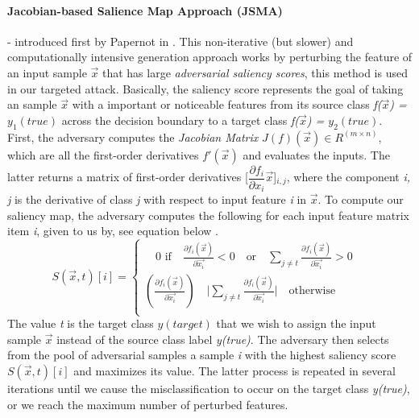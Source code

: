 \documentclass[grad,lot,lof,11pt,oneside,onehalfspace]{RUthesis}
\begin{document}
\paragraph{Jacobian-based Salience Map Approach (JSMA)} - introduced first by Papernot in \cite{papernot_limitations_2016}. This non-iterative (but slower) and computationally intensive generation approach works by perturbing the feature of an input sample $\vec{x}$ that has large \textit{adversarial saliency scores}, this method is used in our targeted attack. Basically, the saliency score represents the goal of taking an sample $\vec{x}$ with a important or noticeable features from its source class \textit{f($\vec{x}$) =  \textit{$y_{1}(true)$}} across the decision boundary to a target class \textit{f($\vec{x}$) =  \textit{$y_{2}(true)$}}.\newline\\
First, the adversary computes the \textit{Jacobian Matrix} \textit{$J(f)(\vec{x})\in R^{(m\times n)}$}, which are all the first-order derivatives \textit{$f'(\vec{x})$} and evaluates the inputs. The latter returns a matrix of first-order derivatives [$\dfrac{\partial f_{i}}{\partial x_{i}}\vec{x}$]$_{i,j}$, where the component\textit{ i, j} is the derivative of class \textit{j} with respect to input feature \textit{i} in \textit{$\vec{x}$}. To compute our saliency map, the adversary computes the following for each input feature  matrix item  \textit{i}, given to us by, see equation below \cite{papernot_cleverhans_2016}.
\begin{equation}
S(\vec{x}, t)[i] =
\begin{cases} 
\quad \textrm{0 if} \quad \frac{\partial f_{i}(\vec{x})}{\partial\vec{x_{i}}} < 0 \quad \textrm{or} \quad \sum_{j\neq t} \frac{\partial f_{i}(\vec{x})}{\partial\vec{x_{i}}} > \textrm{0} \quad\\
(\frac{\partial f_{i}(\vec{x})}{\partial\vec{x_{i}}}) \quad \lvert\sum_{j\neq t} \frac{\partial f_{i}(\vec{x})}{\partial\vec{x_{i}}}\rvert \quad \textrm{otherwise} \quad\\
\end{cases}
\end{equation}    
The value \textit{t} is the target class \textit{$y(target)$} that we wish to assign the input sample $\vec{x}$ instead of the source class label \textit{y(true)}. The adversary then selects from the pool of adversarial samples a sample \textit{i} with the highest saliency score $S(\vec{x}, \textit{t})[i]$ and maximizes its value. The latter process is repeated in several iterations until we cause the misclassification to occur on the target class \textit{y(true)}, or we reach the maximum number of perturbed features. 
\end{document}
